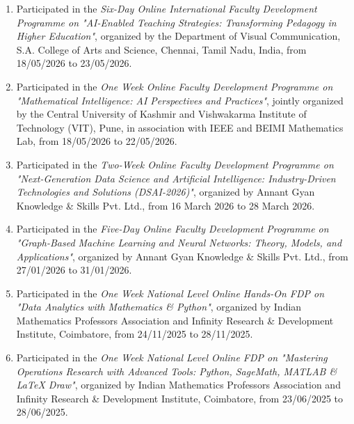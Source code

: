 
\begin{enumerate}[label=\protect\circled{\arabic*}, leftmargin=*, itemsep=1ex]

\item Participated in the \emph{Six-Day Online International Faculty Development Programme on "AI-Enabled Teaching Strategies: Transforming Pedagogy in Higher Education"}, organized by the Department of Visual Communication, S.A. College of Arts and Science, Chennai, Tamil Nadu, India, from 18/05/2026 to 23/05/2026.

\item Participated in the \emph{One Week Online Faculty Development Programme on "Mathematical Intelligence: AI Perspectives and Practices"}, jointly organized by the Central University of Kashmir and Vishwakarma Institute of Technology (VIT), Pune, in association with IEEE and BEIMI Mathematics Lab, from 18/05/2026 to 22/05/2026.

\item Participated in the \emph{Two-Week Online Faculty Development Programme on "Next-Generation Data Science and Artificial Intelligence: Industry-Driven Technologies and Solutions (DSAI-2026)"}, organized by Annant Gyan Knowledge \& Skills Pvt. Ltd., from 16 March 2026 to 28 March 2026.

\item Participated in the \emph{Five-Day Online Faculty Development Programme on "Graph-Based Machine Learning and Neural Networks: Theory, Models, and Applications"}, organized by Annant Gyan Knowledge \& Skills Pvt. Ltd., from 27/01/2026 to 31/01/2026.

\item Participated in the \emph{One Week National Level Online Hands-On FDP on "Data Analytics with Mathematics \& Python"}, organized by Indian Mathematics Professors Association and Infinity Research \& Development Institute, Coimbatore, from 24/11/2025 to 28/11/2025.

\item Participated in the \emph{One Week National Level Online FDP on "Mastering Operations Research with Advanced Tools: Python, SageMath, MATLAB \& LaTeX Draw"}, organized by Indian Mathematics Professors Association and Infinity Research \& Development Institute, Coimbatore, from 23/06/2025 to 28/06/2025.


\end{enumerate}
